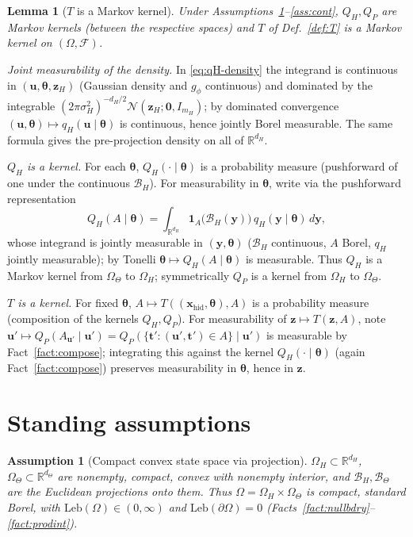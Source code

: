 \documentclass[11pt]{article}
\makeatletter
\theoremstyle{definitionbreak}
\newtheorem{assumption}{Assumption}
\theoremstyle{plainbreak}
\newtheorem{lemma}[theorem]{Lemma}
\theoremstyle{remarkbreak}
\renewenvironment{proof}[1][\proofname]{\par
  \pushQED{\qed}\normalfont
  \topsep6\p@\@plus6\p@\relax
  \trivlist
  \item[\hskip\labelsep\itshape #1\@addpunct{.}]\mbox{}\par\nobreak\ignorespaces
}{\popQED\endtrivlist\@endpefalse}
\newcommand{\R}{\mathbb{R}}
\newcommand{\cF}{\mathcal{F}}
\newcommand{\Om}{\Omega}
\newcommand{\Leb}{\mathrm{Leb}}
\newcommand{\Normal}{\mathcal{N}}
\newcommand{\xhid}{\bm{x}_{\mathrm{hid}}}
\newcommand{\bth}{\bm{\theta}}
\makeatother
\begin{document}
\begin{lemma}[$T$ is a Markov kernel]
\label{lem:measurable}
Under Assumptions~\ref{ass:compact}--\ref{ass:cont}, $Q_H,Q_P$ are Markov kernels (between the
respective spaces) and $T$ of Def.~\ref{def:T} is a Markov kernel on $(\Om,\cF)$.
\end{lemma}
\begin{proof}
\emph{Joint measurability of the density.} In \eqref{eq:qH-density} the integrand is continuous in
$(\bm u,\bth,\bm z_H)$ (Gaussian density and $g_\phi$ continuous) and dominated by the integrable
$(2\pi\sigma_H^2)^{-d_H/2}\Normal(\bm z_H;\bm0,I_{m_H})$; by dominated convergence
$(\bm u,\bth)\mapsto q_H(\bm u\mid\bth)$ is continuous, hence jointly Borel measurable. The same
formula gives the pre-projection density on all of $\R^{d_H}$.

\emph{$Q_H$ is a kernel.} For each $\bth$, $Q_H(\cdot\mid\bth)$ is a probability measure (pushforward
of one under the continuous $\mathcal B_H$). For measurability in $\bth$, write via the pushforward
representation
\[
  Q_H(A\mid\bth)=\int_{\R^{d_H}}\mathbf 1_A\big(\mathcal B_H(\bm y)\big)\,q_H(\bm y\mid\bth)\,d\bm y ,
\]
whose integrand is jointly measurable in $(\bm y,\bth)$ ($\mathcal B_H$ continuous, $A$ Borel, $q_H$
jointly measurable); by Tonelli $\bth\mapsto Q_H(A\mid\bth)$ is measurable. Thus $Q_H$ is a Markov
kernel from $\Om_\Theta$ to $\Om_H$; symmetrically $Q_P$ is a kernel from $\Om_H$ to $\Om_\Theta$.

\emph{$T$ is a kernel.} For fixed $\bth$, $A\mapsto T((\xhid,\bth),A)$ is a probability measure
(composition of the kernels $Q_H,Q_P$). For measurability of $\bm z\mapsto T(\bm z,A)$, note
$\bm u'\mapsto Q_P(A_{\bm u'}\mid\bm u')=Q_P(\{\bm t':(\bm u',\bm t')\in A\}\mid\bm u')$ is measurable
by Fact~\ref{fact:compose}; integrating this against the kernel $Q_H(\cdot\mid\bth)$ (again
Fact~\ref{fact:compose}) preserves measurability in $\bth$, hence in $\bm z$.
\end{proof}

\section{Standing assumptions}
\label{sec:assump}

\begin{assumption}[Compact convex state space via projection]
\label{ass:compact}
$\Om_H\subset\R^{d_H}$, $\Om_\Theta\subset\R^{d_\Theta}$ are nonempty, compact, convex with
nonempty interior, and $\mathcal B_H,\mathcal B_\Theta$ are the Euclidean projections onto them.
Thus $\Om=\Om_H\times\Om_\Theta$ is compact, standard Borel, with $\Leb(\Om)\in(0,\infty)$ and
$\Leb(\partial\Om)=0$ (Facts~\ref{fact:nullbdry}--\ref{fact:prodint}).
\end{assumption}
\end{document}
